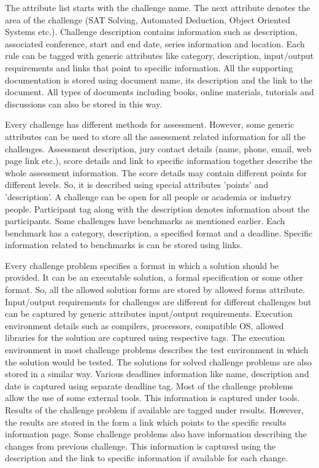 \documentclass[11pt,letterpaper]{report}
\begin{document}
The attribute list starts with the challenge name. The next attribute denotes the area of the challenge (SAT Solving, Automated Deduction, Object Oriented Systems etc.). Challenge description contains information such as description, associated conference, start and end date, series information and location. Each rule can be tagged with generic attributes like category, description, input/output requirements and links that point to specific information. All the supporting documentation is stored using document name, its description and the link to the document. All types of documents including books, online materials, tutorials and discussions can also be stored in this way. 

Every challenge has different methods for assessment. However, some generic attributes can be used to store all the assessment related information for all the challenges. Assessment description, jury contact details (name, phone, email, web page link etc.), score details and link to specific information together describe the whole assessment information. The score details may contain different points for different levels. So, it is described using special attributes 'points' and 'description'. A challenge can be open for all people or academia or industry people. Participant tag along with the description denotes information about the participants. Some challenges have benchmarks as mentioned earlier. Each benchmark has a category, description, a specified format and a deadline. Specific information related to benchmarks is can be stored using links.

Every challenge problem specifies a format in which a solution should be provided. It can be an executable solution, a formal specification or some other format. So, all the allowed solution forms are stored by allowed forms attribute. Input/output requirements for challenges are different for different challenges but can be captured by generic attributes input/output requirements. Execution environment details such as compilers, processors, compatible OS, allowed libraries for the solution are captured using respective tags. The execution environment in most challenge problems describes the test environment in which the solution would be tested.  The solutions for solved challenge problems are also stored in a similar way. Various deadlines information like name, description and date is captured using separate deadline tag. Most of the challenge problems allow the use of some external tools. This information is captured under tools. Results of the challenge problem if available are tagged under results. However, the results are stored in the form a link which points to the specific results information page. Some challenge problems also have information describing the changes from previous challenge. This information is captured using the description and the link to specific information if available for each change.    
\end{document}
